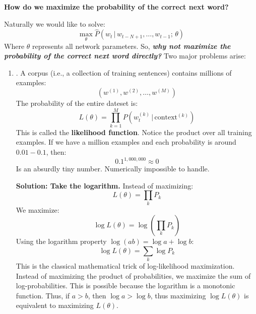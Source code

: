 \highspace
\begin{flushleft}
    \textcolor{Green3}{ \textbf{How do we maximize the probability of the correct next word?}}
\end{flushleft}
Naturally we would like to solve:
\begin{equation*}
    \max_{\theta} \hat{P}(w_t \, | \, w_{t-N+1}, \dots, w_{t-1}; \, \theta)
\end{equation*}
Where $\theta$ represents all network parameters. So, \emph{\textbf{why not maximize the probability of the correct next word directly?}} Two major problems arise:
\begin{enumerate}
    \item {}. A corpus (i.e., a collection of training sentences) contains millions of examples:
    \begin{equation*}
        \left(
            w^{(1)}, w^{(2)}, \dots, w^{(M)}
        \right)
    \end{equation*}
    The probability of the entire dateset is:
    \begin{equation*}
        L\left(\theta\right) = \prod_{k=1}^{M} P\left(w_{t}^{(k)} \, | \, \text{context}^{(k)}\right)
    \end{equation*}
    This is called the \textbf{likelihood function}. Notice the product over all training examples. If we have a million examples and each probability is around $0.01 - 0.1$, then:
    \begin{equation*}
        0.1^{1,000,000} \approx 0
    \end{equation*}
    Is an absurdly tiny number. Numerically impossible to handle.

    \highspace
    \textcolor{Green3}{ \textbf{Solution: Take the logarithm.}} Instead of maximizing:
    \begin{equation*}
        L\left(\theta\right) = \prod_{k} P_k
    \end{equation*}
    We maximize:
    \begin{equation*}
        \log L\left(\theta\right) = \log\left(\prod_k P_k\right)
    \end{equation*}
    Using the logarithm property $\log(ab) = \log a + \log b$:
    \begin{equation*}
        \log L\left(\theta\right) = \sum_k \log P_k
    \end{equation*}
    This is the classical mathematical trick of log-likelihood maximization. Instead of maximizing the product of probabilities, we maximize the sum of log-probabilities. This is possible because the logarithm is a monotonic function. Thus, if $a > b$, then $\log a > \log b$, thus maximizing $\log L\left(\theta\right)$ is equivalent to maximizing $L\left(\theta\right)$.


\end{enumerate}
